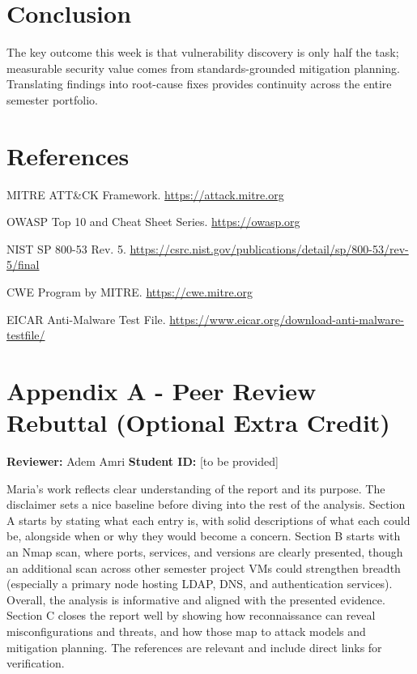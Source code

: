 \documentclass[11pt,a4paper]{article}
\begin{document}
\section*{Conclusion}
The key outcome this week is that vulnerability discovery is only half the task; measurable security value comes from standards-grounded mitigation planning. Translating findings into root-cause fixes provides continuity across the entire semester portfolio.

\section*{References}
\begin{enumerate}[leftmargin=*,label={[\arabic*]}]
  \item MITRE ATT\&CK Framework. \url{https://attack.mitre.org}
  \item OWASP Top 10 and Cheat Sheet Series. \url{https://owasp.org}
  \item NIST SP 800-53 Rev. 5. \url{https://csrc.nist.gov/publications/detail/sp/800-53/rev-5/final}
  \item CWE Program by MITRE. \url{https://cwe.mitre.org}
  \item EICAR Anti-Malware Test File. \url{https://www.eicar.org/download-anti-malware-testfile/}
\end{enumerate}

\appendix
\section*{Appendix A - Peer Review Rebuttal (Optional Extra Credit)}
\textbf{Reviewer:} Adem Amri \hfill \textbf{Student ID:} [to be provided]

Maria's work reflects clear understanding of the report and its purpose. The disclaimer sets a nice baseline before diving into the rest of the analysis. Section A starts by stating what each entry is, with solid descriptions of what each could be, alongside when or why they would become a concern. Section B starts with an Nmap scan, where ports, services, and versions are clearly presented, though an additional scan across other semester project VMs could strengthen breadth (especially a primary node hosting LDAP, DNS, and authentication services). Overall, the analysis is informative and aligned with the presented evidence. Section C closes the report well by showing how reconnaissance can reveal misconfigurations and threats, and how those map to attack models and mitigation planning. The references are relevant and include direct links for verification.
\end{document}

